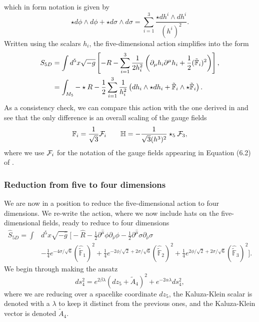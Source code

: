 which in form notation is given by
\begin{equation}
	\star d\phi \wedge d\phi + \star d\sigma \wedge d\sigma =  \sum_{i=1}^3 \frac{\star dh^i \wedge dh^i}{(h^i)^{2}}.
\end{equation}
Written using the scalars $h_i$, the five-dimensional action simplifies into the form
\begin{equation*}
\begin{aligned}
	S_{5D} &= \int d^5x \sqrt{-g} \left[-R - \sum_{i = 1}^3 \frac{1}{2 h_i^2} \left( \partial_\mu h_i \partial^\mu h_i + \frac{1}{2} (\tilde{\mathbb{F}}_i)^2 \right) \right] ,\\
	&= 	\int_{M_5} -\star R  - \frac{1}{2} \sum_{i = 1}^3 \frac{1}{h_i^2} \left(  dh_i \wedge \star dh_i + \tilde{\mathbb{F}}_i \wedge \star \tilde{\mathbb{F}}_i \right) .
\end{aligned}
\end{equation*} 
As a consistency check, we can compare this action with the one derived in \cite{Cortes:2009cs} and see that the only difference is an overall scaling of the gauge fields
\begin{equation}
	\mathbb{F}_i = \frac{1}{\sqrt{3}} {\cal F}_i \qquad \mathbb{H} = -\frac{1}{\sqrt{3} (h^3)^2 } \star_5 {\cal F}_3 ,
\end{equation}
where we use ${\cal F}_i$ for the notation of the gauge fields appearing in Equation (6.2) of \cite{Cortes:2009cs}.

 \subsubsection{Reduction from five to four dimensions}

We are now in a position to reduce the five-dimensional action to four dimensions. We re-write the action, where we now include hats on the five-dimensional fields, ready to reduce to four dimensions
\begin{equation*}
\begin{aligned}
	\hat{S}_{5D} = \int &d^5x \sqrt{-\hat{g}} \; \bigg[ -\hat{R}
	- \frac{1}{2}  \partial^{\hat{\mu}} \phi \partial_{\hat{\nu}} \phi
	- \frac{1}{2}  \partial^{\hat{\mu}} \sigma \partial_{\hat{\nu}} \sigma \\ 
	&- \frac{1}{4} e^{-4 \sigma / \sqrt{6}}  (\hat{\tilde{\mathbb{F}}}_1)^2  + \frac{1}{4} e^{-2\phi/\sqrt{2} +  2\sigma/\sqrt{6}}(\hat{\tilde{\mathbb{F}}}_2)^2  + \frac{1}{4} e^{2\phi/\sqrt{2} +  2\sigma/\sqrt{6}}(\hat{\tilde{\mathbb{F}}}_3)^2  \bigg].
\end{aligned}
\end{equation*}
We begin through making the ansatz
\begin{equation}
\label{eq:KKansatz5d}
  ds^2_{4} =  e^{2 \beta \lambda} (dz_5 + \tilde{A}_4)^2 + e^{-2\alpha \lambda} ds_4^2,
\end{equation}
where we are reducing over a spacelike coordinate $dz_5$, the Kaluza-Klein scalar is denoted with a $\lambda$ to keep it distinct from the previous ones, and the Kaluza-Klein vector is denoted $\tilde{A}_4$. 

